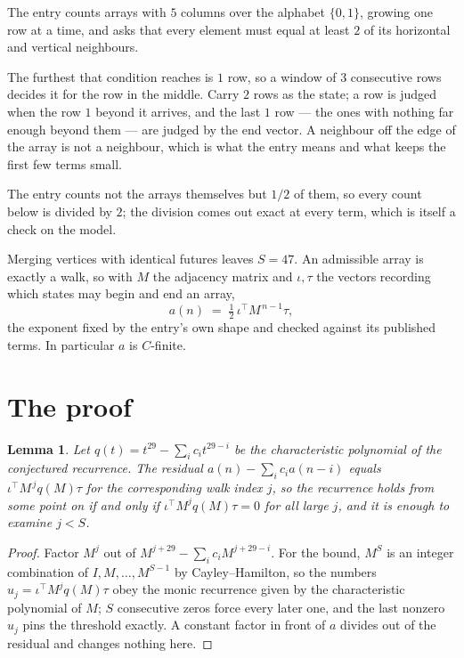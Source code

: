 \documentclass[11pt,a4paper]{article}
\theoremstyle{plain}
\newtheorem{lemma}[theorem]{Lemma}
\theoremstyle{definition}
\begin{document}
The entry counts arrays with $5$ columns over the alphabet $\{0,1\}$, growing one row at a time, and asks that every element must equal at least $2$ of its horizontal and vertical neighbours.

The furthest that condition reaches is $1$ row, so a window of $3$ consecutive rows decides it for the row in the middle. Carry $2$ rows as the state; a row is judged when the row $1$ beyond it arrives, and the last $1$ row --- the ones with nothing far enough beyond them --- are judged by the end vector. A neighbour off the edge of the array is not a neighbour, which is what the entry means and what keeps the first few terms small.

The entry counts not the arrays themselves but $1/2$ of them, so every count below is divided by $2$; the division comes out exact at every term, which is itself a check on the model.

Merging vertices with identical futures leaves $S=47$. An admissible array is exactly a walk, so with $M$ the adjacency matrix and $\iota,\tau$ the vectors recording which states may begin and end an array,
\[
a(n)\;=\;\tfrac{1}{2}\,\iota^{\!\top}M^{\,n-1}\tau ,
\]
the exponent fixed by the entry's own shape and checked against its published terms. In
particular $a$ is $C$-finite.

\section{The proof}

\begin{lemma}\label{lem:crit}
Let $q(t)=t^{29}-\sum_i c_it^{29-i}$ be the characteristic polynomial of the
conjectured recurrence. The residual $a(n)-\sum_ic_ia(n-i)$ equals
$\iota^{\!\top}M^{\,j}q(M)\tau$ for the corresponding walk index $j$, so the recurrence
holds from some point on if and only if $\iota^{\!\top}M^{j}q(M)\tau=0$ for all large $j$,
and it is enough to examine $j<S$.
\end{lemma}

\begin{proof}
Factor $M^{j}$ out of $M^{j+29}-\sum_ic_iM^{j+29-i}$. For the bound, $M^{S}$
is an integer combination of $I,M,\dots,M^{S-1}$ by Cayley--Hamilton, so the numbers
$u_j=\iota^{\!\top}M^{j}q(M)\tau$ obey the monic recurrence given by the characteristic
polynomial of $M$; $S$ consecutive zeros force every later one, and the last nonzero $u_j$
pins the threshold exactly. A constant factor in front of $a$ divides out of the residual and
changes nothing here.
\end{proof}
\end{document}
